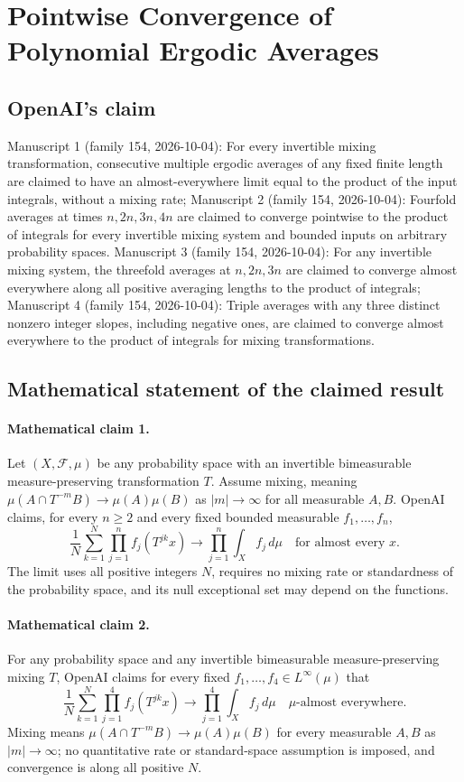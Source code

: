 \documentclass[11pt]{article}
\begin{document}
\section*{Pointwise Convergence of Polynomial Ergodic Averages}

\subsection{OpenAI's claim}
Manuscript 1 (family 154, 2026-10-04): For every invertible mixing transformation, consecutive multiple ergodic averages of any fixed finite length are claimed to have an almost-everywhere limit equal to the product of the input integrals, without a mixing rate; Manuscript 2 (family 154, 2026-10-04): Fourfold averages at times $n,2n,3n,4n$ are claimed to converge pointwise to the product of integrals for every invertible mixing system and bounded inputs on arbitrary probability spaces. Manuscript 3 (family 154, 2026-10-04): For any invertible mixing system, the threefold averages at $n,2n,3n$ are claimed to converge almost everywhere along all positive averaging lengths to the product of integrals; Manuscript 4 (family 154, 2026-10-04): Triple averages with any three distinct nonzero integer slopes, including negative ones, are claimed to converge almost everywhere to the product of integrals for mixing transformations.

\subsection{Mathematical statement of the claimed result}
\paragraph{Mathematical claim 1.} Let $(X,\mathcal F,\mu)$ be any probability space with an invertible bimeasurable measure-preserving transformation $T$. Assume mixing, meaning $\mu(A\cap T^{-m}B)\to\mu(A)\mu(B)$ as $|m|\to\infty$ for all measurable $A,B$. OpenAI claims, for every $n\ge2$ and every fixed bounded measurable $f_1,\ldots,f_n$,
\[
\frac1N\sum_{k=1}^N\prod_{j=1}^n f_j(T^{jk}x)\longrightarrow\prod_{j=1}^n\int_X f_j\,d\mu
\quad\text{for almost every }x.
\]
The limit uses all positive integers $N$, requires no mixing rate or standardness of the probability space, and its null exceptional set may depend on the functions.

\paragraph{Mathematical claim 2.} For any probability space and any invertible bimeasurable measure-preserving mixing $T$, OpenAI claims for every fixed $f_1,\ldots,f_4\in L^\infty(\mu)$ that
\[
\frac1N\sum_{k=1}^N\prod_{j=1}^4 f_j(T^{jk}x)\longrightarrow\prod_{j=1}^4\int_X f_j\,d\mu
\quad\mu\text{-almost everywhere}.
\]
Mixing means $\mu(A\cap T^{-m}B)\to\mu(A)\mu(B)$ for every measurable $A,B$ as $|m|\to\infty$; no quantitative rate or standard-space assumption is imposed, and convergence is along all positive $N$.
\end{document}
